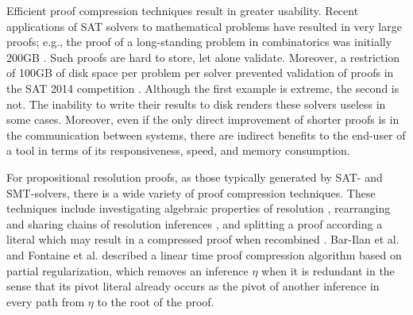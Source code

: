 Efficient proof compression techniques result in greater usability. Recent applications of SAT solvers to mathematical problems have resulted in very large proofs; e.g., the proof of a long-standing problem in combinatorics was initially 200GB \cite{heule2016solving}. Such proofs are hard to store, let alone validate. Moreover, a restriction of 100GB of disk space per problem per solver prevented validation of proofs in the SAT 2014 competition \cite{clausal}. Although the first example is extreme, the second is not. %
The inability to write their results to disk renders these solvers useless in some cases. Moreover, even if the only direct improvement of shorter proofs is in the communication between systems, there are indirect benefits to the end-user of a tool in terms of its responsiveness, speed, and memory consumption.



For propositional resolution proofs, as those typically generated by SAT- and SMT-solvers, there is a wide variety of proof compression techniques. 
These techniques include investigating algebraic properties of resolution \cite{bwp10}, rearranging and sharing chains of resolution inferences \cite{Amjad07, Sinz}, and splitting a proof according a literal which may result in a compressed proof when recombined \cite{CottonSplit}.
Bar-Ilan et al. \cite{RP08} and Fontaine et al. \cite{LURPI} described a linear time proof compression algorithm based on partial
regularization, which removes an inference $\eta$ when it is redundant in the sense that its pivot literal already occurs as the pivot of another inference in every path from $\eta$ to the root of the proof.


